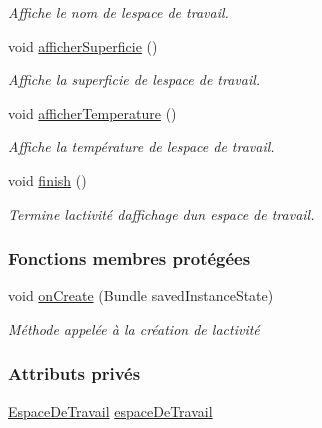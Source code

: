 \begin{DoxyCompactItemize}
\begin{DoxyCompactList}\small\item\em Affiche le nom de l\textquotesingle{}espace de travail. \end{DoxyCompactList}\item 
void \hyperlink{classcom_1_1lasalle_1_1meeting_1_1_affichage_espace_de_travail_ae8f1d5cb6d99aced1996b1b2bbcebe26}{afficher\+Superficie} ()
\begin{DoxyCompactList}\small\item\em Affiche la superficie de l\textquotesingle{}espace de travail. \end{DoxyCompactList}\item 
void \hyperlink{classcom_1_1lasalle_1_1meeting_1_1_affichage_espace_de_travail_a9474bdc380c78e632cc8d384d7393f50}{afficher\+Temperature} ()
\begin{DoxyCompactList}\small\item\em Affiche la température de l\textquotesingle{}espace de travail. \end{DoxyCompactList}\item 
void \hyperlink{classcom_1_1lasalle_1_1meeting_1_1_affichage_espace_de_travail_a2f3649336aff1f2126f817c72faf30c2}{finish} ()
\begin{DoxyCompactList}\small\item\em Termine l\textquotesingle{}activité d\textquotesingle{}affichage d\textquotesingle{}un espace de travail. \end{DoxyCompactList}\end{DoxyCompactItemize}
\subsubsection*{Fonctions membres protégées}
\begin{DoxyCompactItemize}
\item 
void \hyperlink{classcom_1_1lasalle_1_1meeting_1_1_affichage_espace_de_travail_a333ff077dde89888afc62366f6dccf06}{on\+Create} (Bundle saved\+Instance\+State)
\begin{DoxyCompactList}\small\item\em Méthode appelée à la création de l\textquotesingle{}activité \end{DoxyCompactList}\end{DoxyCompactItemize}
\subsubsection*{Attributs privés}
\begin{DoxyCompactItemize}
\item 
\hyperlink{classcom_1_1lasalle_1_1meeting_1_1_espace_de_travail}{Espace\+De\+Travail} \hyperlink{classcom_1_1lasalle_1_1meeting_1_1_affichage_espace_de_travail_a934d41c1c41882b94b65a95cee5aca13}{espace\+De\+Travail}
\end{DoxyCompactItemize}
